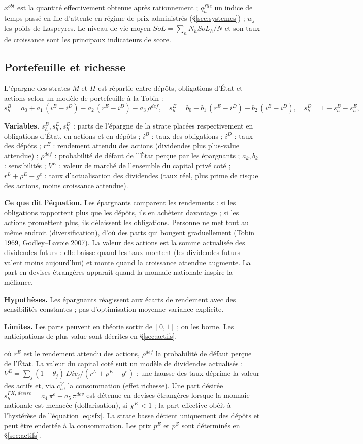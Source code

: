 \documentclass[11pt,a4paper]{article}
\newcommand{\variables}{\par\noindent\textbf{Variables.} }
\newcommand{\sens}{\par\noindent\textbf{Ce que dit l'équation.} }
\newcommand{\hyp}{\par\noindent\textbf{Hypothèses.} }
\newcommand{\limites}{\par\noindent\textbf{Limites.} }
\begin{document}
$x^{obt}$ est la quantité effectivement obtenue après rationnement ; $q^{file}_h$ un indice de temps passé en file d'attente en régime de prix administrés (\S\ref{sec:systemes}) ; $w_j$ les poids de Laspeyres. Le niveau de vie moyen $\overline{SoL} = \sum_h N_h SoL_h / N$ et son taux de croissance sont les principaux indicateurs de score.

\subsection{Portefeuille et richesse}
L'épargne des strates $M$ et $H$ est répartie entre dépôts, obligations d'État et actions selon un modèle de portefeuille à la Tobin :
\begin{equation}
s^{B}_h = a_0 + a_1\,(i^B - i^D) - a_2\,(r^E - i^D) - a_3\,\rho^{def},\quad
s^{E}_h = b_0 + b_1\,(r^E - i^D) - b_2\,(i^B - i^D),\quad s^D_h = 1 - s^B_h - s^E_h,
\label{eq:portfolio}
\end{equation}
\begin{lecture}
\variables $s^B_h, s^E_h, s^D_h$ : parts de l'épargne de la strate placées respectivement en obligations d'État, en actions et en dépôts ; $i^B$ : taux des obligations ; $i^D$ : taux des dépôts ; $r^E$ : rendement attendu des actions (dividendes plus plus-value attendue) ; $\rho^{def}$ : probabilité de défaut de l'État perçue par les épargnants ; $a_k, b_k$ : sensibilités ; $V^E$ : valeur de marché de l'ensemble du capital privé coté ; $r^L+\rho^E-g^e$ : taux d'actualisation des dividendes (taux réel, plus prime de risque des actions, moins croissance attendue).
\sens Les épargnants comparent les rendements : si les obligations rapportent plus que les dépôts, ils en achètent davantage ; si les actions promettent plus, ils délaissent les obligations. Personne ne met tout au même endroit (diversification), d'où des parts qui bougent graduellement (Tobin 1969, Godley--Lavoie 2007). La valeur des actions est la somme actualisée des dividendes futurs : elle baisse quand les taux montent (les dividendes futurs valent moins aujourd'hui) et monte quand la croissance attendue augmente. La part en devises étrangères apparaît quand la monnaie nationale inspire la méfiance.
\hyp Les épargnants réagissent aux écarts de rendement avec des sensibilités constantes ; pas d'optimisation moyenne-variance explicite.
\limites Les parts peuvent en théorie sortir de $[0,1]$ ; on les borne. Les anticipations de plus-value sont décrites en \S\ref{sec:actifs}.
\end{lecture}
où $r^E$ est le rendement attendu des actions, $\rho^{def}$ la probabilité de défaut perçue de l'État. La valeur du capital coté suit un modèle de dividendes actualisés : $V^E = \sum_j (1-\theta_j)\, Div_j / (r^L + \rho^E - g^e)$ ; une hausse des taux déprime la valeur des actifs et, via $c^V_h$, la consommation (effet richesse). Une part désirée $s^{FX,\,d\acute{e}sir\acute{e}}_h = a_4\,\pi^e + a_5\,\pi^{dev}$ est détenue en devises étrangères lorsque la monnaie nationale est menacée (dollarisation), si $\chi^K < 1$ ; la part effective obéit à l'hystérèse de l'équation \eqref{eq:sfx}. La strate basse détient uniquement des dépôts et peut être endettée à la consommation. Les prix $p^E$ et $p^Z$ sont déterminés en \S\ref{sec:actifs}.
\end{document}
